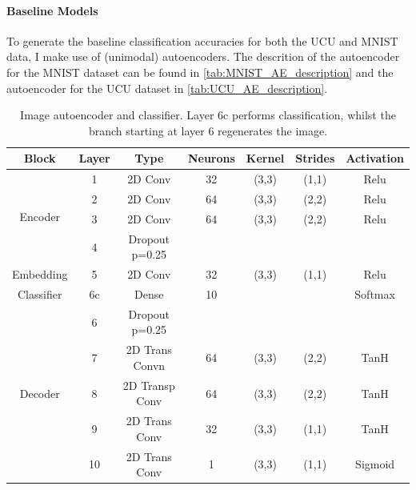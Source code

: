 \paragraph{Baseline Models}
To generate the baseline classification accuracies for both the UCU and MNIST data, I make use of (unimodal) autoencoders. The descrition of the autoencoder for the MNIST dataset can be found in \autoref{tab:MNIST_AE_description} and the autoencoder for the UCU dataset in \autoref{tab:UCU_AE_description}.

	\begin{table}[th!]
		\centering
		\begin{tabular}{|c|c|c|c|c|c|c|}
			\hline
			\textbf{Block} & \textbf{Layer} & \textbf{Type} & \textbf{Neurons} & \textbf{Kernel} & \textbf{Strides} & \textbf{Activation}  \\ \hline
			\multirow{4}{*}{Encoder} & 1	&	2D Conv & 32 & (3,3) & (1,1)  & Relu\\ \cline{2-7}
			& 2	&	2D Conv & 64 & (3,3) & (2,2) & Relu \\ \cline{2-7}
			& 3	&	2D Conv & 64 & (3,3) & (2,2) & Relu \\ \cline{2-7}
			& 4 	&	Dropout p=0.25 &	 & 	     &       & \\ \hline
			Embedding & 5	&	2D Conv & 32 & (3,3) & (1,1) & Relu \\ \hline
			Classifier & 6c	&	Dense          & 10 &       &       & Softmax      \\ \hline
			\multirow{5}{*}{Decoder}& 6 	&	Dropout p=0.25 &	 & 	     &       & \\ \cline{2-7}
			& 7	&	2D Trans Convn & 64 & (3,3) & (2,2) & TanH \\ \cline{2-7}
			& 8	&	2D Transp Conv & 64 & (3,3) & (2,2) & TanH \\ \cline{2-7}
			& 9	&	2D Trans Conv & 32 & (3,3) & (1,1) & TanH \\ \cline{2-7}
			& 10	&	2D Trans Conv & 1 & (3,3) & (1,1) & Sigmoid \\ \hline
		\end{tabular}
		\caption{Image autoencoder and classifier. Layer 6c performs classification, whilst the branch starting at layer 6 regenerates the image.}
		\label{tab:MNIST_AE_description}
	\end{table}

